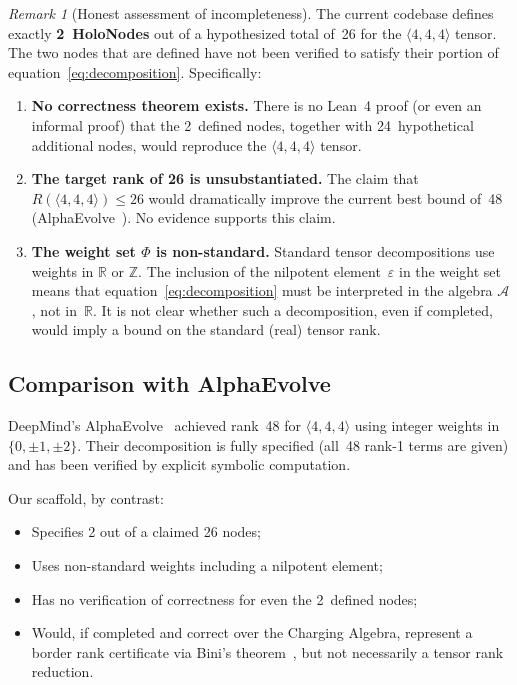 \documentclass[11pt,a4paper]{article}
\theoremstyle{definition}
\theoremstyle{remark}
\newtheorem{remark}[theorem]{Remark}
\newcommand{\mmtensor}[3]{\langle #1, #2, #3 \rangle}
\begin{document}
\begin{remark}[Honest assessment of incompleteness]\label{rem:incomplete}
The current codebase defines exactly \textbf{2~HoloNodes} out of
a hypothesized total of~26 for the $\mmtensor{4}{4}{4}$ tensor.
The two nodes that are defined have not been verified to satisfy
their portion of equation~\eqref{eq:decomposition}.
Specifically:
\begin{enumerate}
  \item \textbf{No correctness theorem exists.} There is no Lean~4
        proof (or even an informal proof) that the 2~defined nodes,
        together with 24~hypothetical additional nodes, would reproduce
        the $\mmtensor{4}{4}{4}$ tensor.
  \item \textbf{The target rank of 26 is unsubstantiated.} The claim
        that $R(\mmtensor{4}{4}{4}) \le 26$ would dramatically improve
        the current best bound of~48 (AlphaEvolve~\cite{AlphaEvolve2025}).
        No evidence supports this claim.
  \item \textbf{The weight set $\Phi$ is non-standard.} Standard tensor
        decompositions use weights in $\mathbb{R}$ or $\mathbb{Z}$.
        The inclusion of the nilpotent element~$\varepsilon$ in the
        weight set means that equation~\eqref{eq:decomposition} must
        be interpreted in the algebra $\mathcal{A}$, not in~$\mathbb{R}$.
        It is not clear whether such a decomposition, even if completed,
        would imply a bound on the standard (real) tensor rank.
\end{enumerate}
\end{remark}

\subsection{Comparison with AlphaEvolve}

DeepMind's AlphaEvolve~\cite{AlphaEvolve2025} achieved rank~48
for $\mmtensor{4}{4}{4}$ using integer weights in $\{0, \pm 1, \pm 2\}$.
Their decomposition is fully specified (all~48 rank-1 terms are
given) and has been verified by explicit symbolic computation.

Our scaffold, by contrast:
\begin{itemize}
  \item Specifies 2 out of a claimed 26 nodes;
  \item Uses non-standard weights including a nilpotent element;
  \item Has no verification of correctness for even the 2~defined nodes;
  \item Would, if completed and correct over the Charging Algebra,
        represent a border rank certificate via Bini's
        theorem~\cite{Bini1980}, but not necessarily a tensor rank
        reduction.
\end{itemize}
\end{document}
